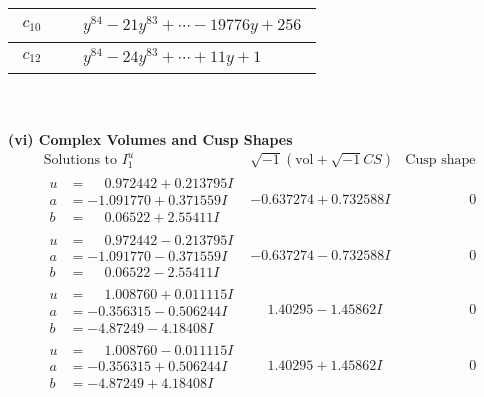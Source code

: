 \documentclass[1p]{elsarticle_modified}
\theoremstyle{definition}
\newcommand{\I}{\sqrt{-1}}
\begin{document}
\begin{tabular}{m{50pt}|m{274pt}}
\hline $$\begin{aligned}c_{10}\end{aligned}$$&$\begin{aligned}
&y^{84}-21 y^{83}+\cdots-19776 y+256
\end{aligned}$\\
\hline $$\begin{aligned}c_{12}\end{aligned}$$&$\begin{aligned}
&y^{84}-24 y^{83}+\cdots+11 y+1
\end{aligned}$\\
\hline
\end{tabular}\\~\\
\newpage\flushleft \textbf{(vi) Complex Volumes and Cusp Shapes}
$$\begin{array}{c|c|c}  
\text{Solutions to }I^u_{1}& \I (\text{vol} + \sqrt{-1}CS) & \text{Cusp shape}\\
 \hline 
\begin{aligned}
u &= \phantom{-}0.972442 + 0.213795 I \\
a &= -1.091770 + 0.371559 I \\
b &= \phantom{-}0.06522 + 2.55411 I\end{aligned}
 & -0.637274 + 0.732588 I & \phantom{-0.000000 } 0 \\ \hline\begin{aligned}
u &= \phantom{-}0.972442 - 0.213795 I \\
a &= -1.091770 - 0.371559 I \\
b &= \phantom{-}0.06522 - 2.55411 I\end{aligned}
 & -0.637274 - 0.732588 I & \phantom{-0.000000 } 0 \\ \hline\begin{aligned}
u &= \phantom{-}1.008760 + 0.011115 I \\
a &= -0.356315 - 0.506244 I \\
b &= -4.87249 - 4.18408 I\end{aligned}
 & \phantom{-}1.40295 - 1.45862 I & \phantom{-0.000000 } 0 \\ \hline\begin{aligned}
u &= \phantom{-}1.008760 - 0.011115 I \\
a &= -0.356315 + 0.506244 I \\
b &= -4.87249 + 4.18408 I\end{aligned}
 & \phantom{-}1.40295 + 1.45862 I & \phantom{-0.000000 } 0 \\ \hline\begin{aligned}

\end{aligned}
\end{array}$$
\end{document}
